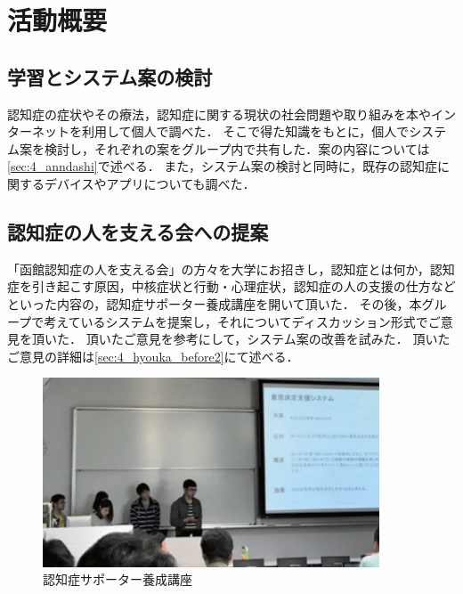\documentclass[../report]{subfiles}
\begin{document}
\section{活動概要}
\subsection{学習とシステム案の検討} \label{sec:discuss}
認知症の症状やその療法，認知症に関する現状の社会問題や取り組みを本やインターネットを利用して個人で調べた．
そこで得た知識をもとに，個人でシステム案を検討し，それぞれの案をグループ内で共有した．案の内容については\ref{sec:4_anndashi}で述べる．
また，システム案の検討と同時に，既存の認知症に関するデバイスやアプリについても調べた．

\subsection{認知症の人を支える会への提案}
「函館認知症の人を支える会」の方々を大学にお招きし，認知症とは何か，認知症を引き起こす原因，中核症状と行動・心理症状，認知症の人の支援の仕方などといった内容の，認知症サポーター養成講座を開いて頂いた．
その後，本グループで考えているシステムを提案し，それについてディスカッション形式でご意見を頂いた．
頂いたご意見を参考にして，システム案の改善を試みた．
頂いたご意見の詳細は\ref{sec:4_hyouka_before2}にて述べる．
\begin{figure}[htbp]
    \begin{center}
        \includegraphics[width=10cm]{imgs/2_idea_review1.png}
        \caption{認知症サポーター養成講座}
    \end{center}
\end{figure}
\end{document}
